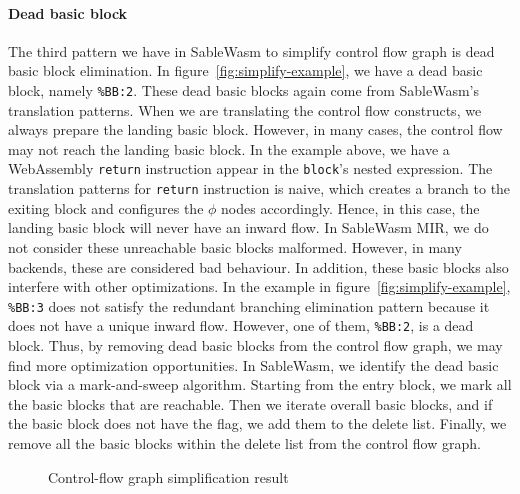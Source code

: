 \paragraph{Dead basic block}
The third pattern we have in SableWasm to simplify control flow graph is dead
basic block elimination. In figure~\ref{fig:simplify-example}, we have a dead
basic block, namely \texttt{\%BB:2}. These dead basic blocks again come from
SableWasm's translation patterns. When we are translating the control flow
constructs, we always prepare the landing basic block. However, in many cases,
the control flow may not reach the landing basic block. In the example above,
we have a WebAssembly \texttt{return} instruction appear in the \texttt{block}'s
nested expression. The translation patterns for \texttt{return} instruction is
naive, which creates a branch to the exiting block and configures the $\phi$
nodes accordingly. Hence, in this case, the landing basic block will never have
an inward flow. In SableWasm MIR, we do not consider these unreachable basic
blocks malformed. However, in many backends, these are considered bad behaviour.
In addition, these basic blocks also interfere with other optimizations. In the
example in figure~\ref{fig:simplify-example}, \texttt{\%BB:3} does not satisfy
the redundant branching elimination pattern because it does not have a unique
inward flow. However, one of them, \texttt{\%BB:2}, is a dead block. Thus, by
removing dead basic blocks from the control flow graph, we may find more
optimization opportunities. In SableWasm, we identify the dead basic block via
a mark-and-sweep algorithm. Starting from the entry block, we mark all the basic
blocks that are reachable. Then we iterate overall basic blocks, and if the
basic block does not have the flag, we add them to the delete list. Finally, we
remove all the basic blocks within the delete list from the control flow graph.

\begin{figure}
    
    \caption{Control-flow graph simplification result}
    \label{fig:simplify-result}
\end{figure}

